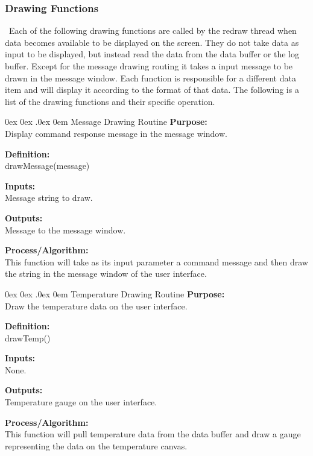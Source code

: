 \documentclass[10pt,draftclsnofoot,onecolumn,compsoc]{IEEEtran}
\makeatletter
\renewcommand\paragraph{\@startsection{paragraph}{4}{\z@}%
                                    {0ex \@plus0ex \@minus.0ex}%
                                    {0em}%
                                    {\normalfont\normalsize\bfseries}}
\makeatother
\begin{document}
\subsubsection{Drawing Functions}\
Each of the following drawing functions are called by the redraw thread when data becomes available to be displayed on the screen. They do not take data as input to be displayed, but instead read the data from the data buffer or the log buffer. Except for the message drawing routing it takes a input message to be drawn in the message window. Each function is responsible for a different data item and will display it according to the format of that data. The following is a list of the drawing functions and their specific operation.

\paragraph{Message Drawing Routine}
{\bf Purpose:} \\
Display command response message in the message window.  \par
{\bf Definition:} \\ 
drawMessage(message) \par
{\bf Inputs:} \\ Message string to draw.\par
{\bf Outputs:} \\Message to the message window. \par
{\bf Process/Algorithm:} \\
This function will take as its input parameter a command message and then draw the string in the message window of the user interface. \par

\paragraph{Temperature Drawing Routine}
{\bf Purpose:} \\
Draw the temperature data on the user interface.  \par
{\bf Definition:} \\ 
drawTemp() \par
{\bf Inputs:} \\None. \par
{\bf Outputs:} \\Temperature gauge on the user interface.\par
{\bf Process/Algorithm:} \\
This function will pull temperature data from the data buffer and draw a gauge representing the data on the temperature canvas. \par
\end{document}
